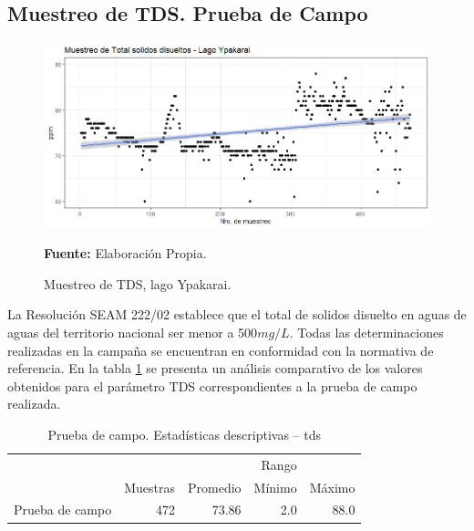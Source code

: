 \subsection{Muestreo de TDS. Prueba de Campo}

\begin{figure}[H]
        \centering
        \includegraphics[width=0.75\linewidth]{Imagenes/cap4/TDS LagoYpakarai.png}
        \caption {Muestreo de TDS, lago Ypakarai. }{\textbf{Fuente:}
        Elaboraci\'on Propia. }
        \label{fig:Lago_tds}
\end{figure}

La Resoluci\'on SEAM 222/02 establece que el total de solidos disuelto en aguas de aguas del territorio nacional ser menor a  500$ mg /L$. Todas las determinaciones realizadas en la campa\~na se encuentran en conformidad con la normativa de referencia.
En la tabla \ref{table:Lago_tds} se presenta un an\'alisis comparativo de los valores obtenidos para el par\'ametro TDS correspondientes a la prueba de campo  realizada.

\begin{table}[H]
\centering
\caption{Prueba de campo. Estadísticas descriptivas – tds}
\label{table:Lago_tds}
\begin{tabular}{lrrrr}
\toprule
          & \multicolumn{3}{r}{Rango} \\ \cline{4-5}
          & Muestras & Promedio & Mínimo & Máximo \\
\midrule
Prueba de campo  &      472 &    73.86 &    2.0 &   88.0 \\
\bottomrule
\end{tabular}
\end{table}

